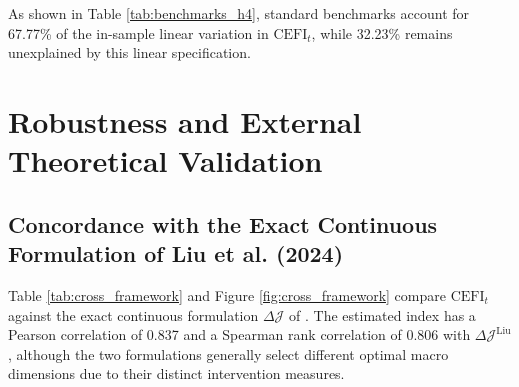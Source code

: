 \documentclass[review,12pt,authoryear]{elsarticle}
\begin{document}
\begin{table}[htbp]
\centering
\caption{Linear Association Between $\mathrm{CEFI}_t$ and Conventional Systemic Risk Benchmarks (HAC Newey-West $L=40$)}
\label{tab:benchmarks_h4}
\end{table}

As shown in Table \ref{tab:benchmarks_h4}, standard benchmarks account for 67.77\% of the in-sample linear variation in $\mathrm{CEFI}_t$, while 32.23\% remains unexplained by this linear specification.

\section{Robustness and External Theoretical Validation}
\label{sec:robustness}

\subsection{Concordance with the Exact Continuous Formulation of Liu et al. (2024)}
Table \ref{tab:cross_framework} and Figure \ref{fig:cross_framework} compare $\mathrm{CEFI}_t$ against the exact continuous formulation $\Delta \mathcal{J}$ of \citet{liu2024exact}. The estimated index has a Pearson correlation of 0.837 and a Spearman rank correlation of 0.806 with $\Delta \mathcal{J}^{\text{Liu}}$, although the two formulations generally select different optimal macro dimensions due to their distinct intervention measures.
\end{document}
